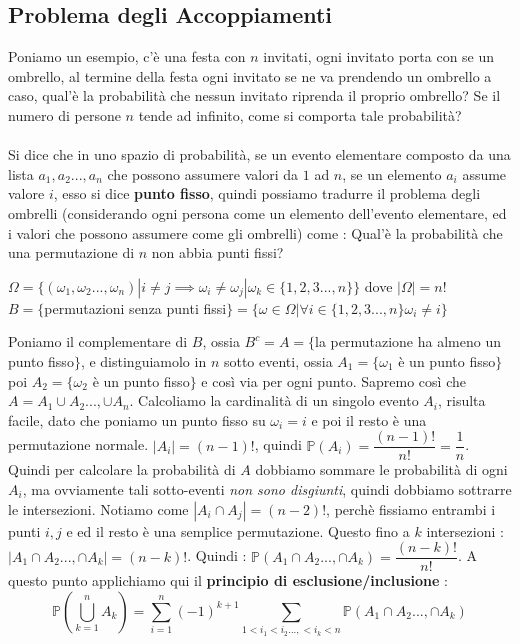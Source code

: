 \documentclass[12pt, letterpaper]{article}
\begin{document}
\subsection{Problema degli Accoppiamenti}
Poniamo un esempio, c'è una festa con \(n\) invitati, ogni invitato porta con se un ombrello, 
al termine della festa ogni invitato se ne va prendendo un ombrello a caso, qual'è la probabilità 
che nessun invitato riprenda il proprio ombrello? Se il numero di persone \(n\) tende ad 
infinito, come si comporta tale probabilità?\\\hphantom{.}\\ Si dice che in uno spazio di probabilità, 
se un evento elementare composto da una lista \(a_1,a_2...,a_n\) che possono assumere 
valori da \(1\) ad \(n\), se un elemento \(a_i\) assume valore \(i\), esso si dice \textbf{punto fisso},
quindi possiamo tradurre il problema degli ombrelli (considerando ogni persona come un elemento dell'evento 
elementare, ed i valori che possono assumere come gli ombrelli) come : Qual'è la probabilità che una permutazione 
di \(n\) non abbia punti fissi?\begin{center}
    \(\Omega=\{(\omega_1,\omega_2...,\omega_n)|i\ne j \implies \omega_i\ne \omega_j |\omega_k \in \{1,2,3...,n\} \}\) dove \(|\Omega|=n!\)
    \\\(B=\{\)permutazioni senza punti fissi\(\}=\{\omega\in\Omega | \forall i \in\{1,2,3...,n\} \omega_i\ne i \}\)
\end{center}
Poniamo il complementare di \(B\), ossia \(B^c=A=\{\)la permutazione ha almeno un punto fisso\(\}\), e distinguiamolo 
in \(n\) sotto eventi, ossia \(A_1=\{\omega_1\) è un punto fisso\(\}\) poi 
\(A_2=\{\omega_2\) è un punto fisso\(\}\) e così via per ogni punto. Sapremo così che 
\(A=A_1\cup A_2..., \cup A_n\). Calcoliamo la cardinalità di un singolo evento \(A_i\), risulta 
facile, dato che poniamo un punto fisso su \(\omega_i = i\) e poi il resto è una permutazione 
normale. \(|A_i|=(n-1)!\), quindi \(\mathbb{P}(A_i)=\dfrac{(n-1)!}{n!}=\dfrac{1}{n}\). Quindi per calcolare 
la probabilità di \(A\) dobbiamo sommare le probabilità di ogni \(A_i\), ma ovviamente tali sotto-eventi 
\textit{non sono disgiunti}, quindi dobbiamo sottrarre le intersezioni.
Notiamo come \(|A_i\cap A_j|=(n-2)!\), perchè fissiamo entrambi i punti \(i,j\) e ed il resto 
è una semplice permutazione. Questo fino a \(k\) intersezioni : \(|A_1\cap A_2...,\cap A_k|=(n-k)!\). Quindi :
\(\mathbb{P}(A_1\cap A_2...,\cap A_k) =\dfrac{(n-k)!}{n!}\). A questo punto applichiamo qui il 
\textbf{principio di esclusione/inclusione} :\begin{equation}
    \mathbb{P}(\bigcup^n_{k=1}A_k )=\sum_{i=1}^n (-1)^{k+1}\sum_{1<i_1<i_2...,<i_k<n}\mathbb{P}(A_1\cap A_2...,\cap A_k)
\end{equation}
\end{document}
